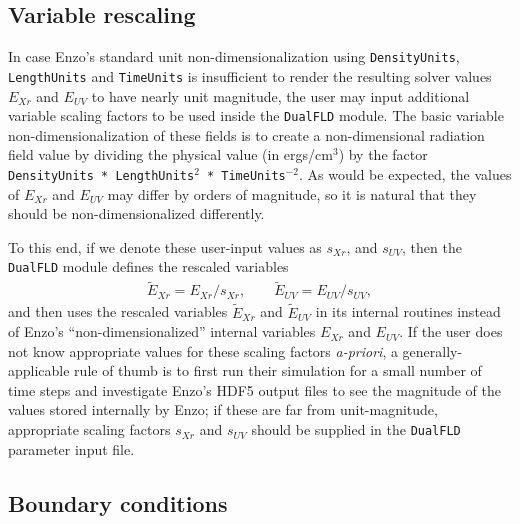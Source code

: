 \documentclass[letterpaper,10pt]{article}
\renewcommand{\(}{\left(}
\renewcommand{\)}{\right)}
\begin{document}
\subsection{Variable rescaling}
\label{sec:variable_rescaling}

In case Enzo's standard unit non-dimensionalization using 
{\tt DensityUnits}, {\tt LengthUnits} and {\tt TimeUnits} is
insufficient to render the resulting solver values $E_{Xr}$ and
$E_{UV}$ to have nearly unit magnitude, the user may input additional
variable scaling factors to be used inside the {\tt DualFLD} module.
The basic variable non-dimensionalization of these fields is to create
a non-dimensional radiation field value by dividing the physical value
(in ergs/cm$^3$) by the factor {\tt DensityUnits * LengthUnits$^2$ *
TimeUnits$^{-2}$}.  As would be expected, the values of $E_{Xr}$ and
$E_{UV}$ may differ by orders of magnitude, so it is natural that they
should be non-dimensionalized differently.

To this end, if we denote these user-input values as $s_{Xr}$, and
$s_{UV}$, then the {\tt DualFLD} module defines the rescaled variables 
\begin{align}
\label{eq:variable_rescaling}
  \tilde{E}_{Xr} = E_{Xr} / s_{Xr}, \qquad \tilde{E}_{UV} = E_{UV} / s_{UV},
\end{align}
and then uses the rescaled variables $\tilde{E}_{Xr}$ and
$\tilde{E}_{UV}$ in its internal routines instead of Enzo's
``non-dimensionalized'' internal
variables $E_{Xr}$ and $E_{UV}$.  If the user does not know
appropriate values for these scaling factors {\em a-priori}, a
generally-applicable rule of thumb is to first run their simulation
for a small number of time steps and investigate Enzo's HDF5 output
files to see the magnitude of the values stored internally by Enzo; if
these are far from unit-magnitude, appropriate scaling factors
$s_{Xr}$ and $s_{UV}$ should be supplied in the {\tt DualFLD}
parameter input file.




\subsection{Boundary conditions}
\label{sec:boundary_conditions}
\end{document}
